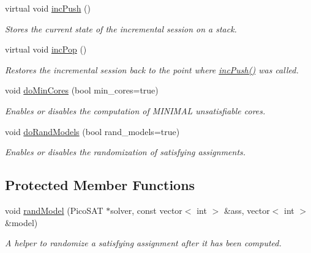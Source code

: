 \begin{DoxyCompactItemize}
virtual void \hyperlink{classPicoSatApi_a523f9de3a59f927cb6ad0729e1caaac7}{inc\-Push} ()
\begin{DoxyCompactList}\small\item\em Stores the current state of the incremental session on a stack. \end{DoxyCompactList}\item 
virtual void \hyperlink{classPicoSatApi_a045c7a5229d4e45095922e1315c5c282}{inc\-Pop} ()
\begin{DoxyCompactList}\small\item\em Restores the incremental session back to the point where \hyperlink{classPicoSatApi_a523f9de3a59f927cb6ad0729e1caaac7}{inc\-Push()} was called. \end{DoxyCompactList}\item 
void \hyperlink{classSatSolver_a159fc9658709e5aeba2844a09454b2cb}{do\-Min\-Cores} (bool min\-\_\-cores=true)
\begin{DoxyCompactList}\small\item\em Enables or disables the computation of M\-I\-N\-I\-M\-A\-L unsatisfiable cores. \end{DoxyCompactList}\item 
void \hyperlink{classSatSolver_ae229c5e277350710412fce0e867dc566}{do\-Rand\-Models} (bool rand\-\_\-models=true)
\begin{DoxyCompactList}\small\item\em Enables or disables the randomization of satisfying assignments. \end{DoxyCompactList}\end{DoxyCompactItemize}
\subsection*{Protected Member Functions}
\begin{DoxyCompactItemize}
\item 
void \hyperlink{classPicoSatApi_ab0ded3e44578129ae266936de5e29a1c}{rand\-Model} (Pico\-S\-A\-T $\ast$solver, const vector$<$ int $>$ \&ass, vector$<$ int $>$ \&model)
\begin{DoxyCompactList}\small\item\em A helper to randomize a satisfying assignment after it has been computed. \end{DoxyCompactList}\end{DoxyCompactItemize}

